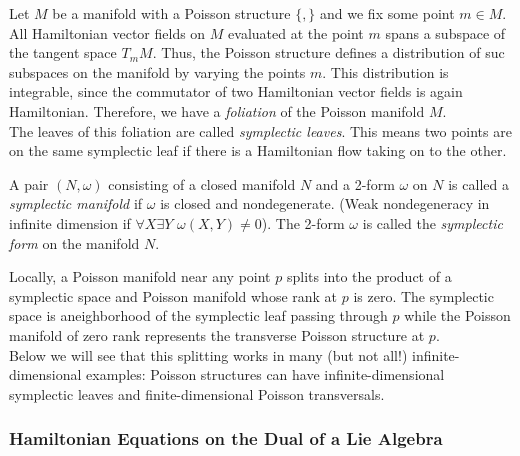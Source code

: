 \begin{rmk}

	Let $M$ be a manifold with a Poisson structure $ \{ , \} $ and we fix some point $m \in M$. All Hamiltonian vector fields on $M$ evaluated at the point $m$ spans a subspace of the tangent space $T_m M$. Thus, the Poisson structure defines a distribution of suc subspaces on the manifold by varying the points $m$. This distribution is integrable, since the commutator of two Hamiltonian vector fields is again Hamiltonian. Therefore, we have a \textit{foliation} of the Poisson manifold $M$.\\
\indent The leaves of this foliation are called \textit{symplectic leaves}. This means two points are on the same symplectic leaf if there is a Hamiltonian flow taking on to the other.

\end{rmk}

\begin{defn}

	A pair $(N,\omega)$ consisting of a closed manifold $N$ and a 2-form $\omega$ on $N$ is called a \textit{symplectic manifold} if $\omega$ is closed and nondegenerate. (Weak nondegeneracy in infinite dimension if $\forall X \exists Y \hspace{4pt} \omega(X,Y) \neq 0$). The 2-form $\omega$ is called the \textit{symplectic form} on the manifold $N$.\\

\end{defn}


\begin{rmk}

Locally, a Poisson manifold near any point $p$ splits into the product of a symplectic space and Poisson manifold whose rank at $p$ is zero. The symplectic space is aneighborhood of the symplectic leaf passing through $p$ while the Poisson manifold of zero rank represents the transverse Poisson structure at $p$.\\
\indent Below we will see that this splitting works in many (but not all!) infinite-dimensional examples: Poisson structures can have infinite-dimensional symplectic leaves and finite-dimensional Poisson transversals.

\end{rmk}

\subsubsection{Hamiltonian Equations on the Dual of a Lie Algebra}

